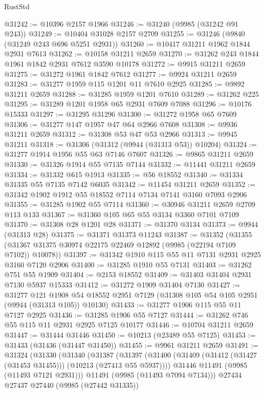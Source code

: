 \begin{lexlean}{RustStd}
\begin{coremodule}
@31242 := @10396 @2157 @1966
@31246 := @31240 (@9985 (@31242 @91 @243))
@31249 := @10404 @31028 @2157 @2709
@31255 := @31246 (@9840 (@31249 @243 @696 @5251 @2931))
@31260 := @10417 @31211 @1962 @1844 @2931 @7613
@31262 := @10158 @31211 @2659
@31270 := @31262 @243 @1844 @1961 @1842 @2931 @7612 @3590 @10178
@31272 := @9915 @31211 @2659
@31275 := @31272 @1961 @1842 @7612
@31277 := @9924 @31211 @2659
@31283 := @31277 @1959 @115 @1201 @11 @7610 @2925
@31285 := @9892 @31211 @2659
@31288 := @31285 @1959 @1201 @7610
@31289 := @31262 @225
@31295 := @31289 @1201 @1958 @65 @2931 @7609 @7088
@31296 := @10176 @15333
@31297 := @31295 @31296
@31300 := @31272 @1958 @65 @7609
@31306 := @31277 @147 @1957 @47 @64 @2966 @7608
@31308 := @9936 @31211 @2659
@31312 := @31308 @53 @47 @53 @2966
@31313 := @9945 @31211
@31318 := @31306 (@31312 (@9944 (@31313 @53)) @10204)
@31324 := @31277 @1914 @1956 @55 @63 @7146 @7607
@31326 := @9865 @31211 @2659
@31330 := @31326 @1914 @55 @7135 @7144
@31332 := @11441 @31211 @2659
@31334 := @31332 @615 @1913
@31335 := @56 @18552
@31340 := @31334 @31335 @55 @7135 @7142 @6035
@31342 := @11454 @31211 @2659
@31352 := @31342 @1902 @1912 @55 @18552 @7114 @7134 @7141 @3160 @7093 @2906
@31355 := @31285 @1902 @55 @7114
@31360 := @30946 @31211 @2659 @2709 @113 @133
@31367 := @31360 @105 @65 @55 @3134 @3360 @7101 @7109
@31370 := @31308 @28 @1201 @28
@31371 := @31370 @3134
@31373 := @9944 (@31313 @28)
@31375 := @31371 @31373 @11243
@31387 := @31352
    (@31355 (@31367 @31375 @30974 @22175 @22469 @12892 (@9985 (@22194 @7109 @7102)) @10078))
@31397 := @31342 @1910 @115 @55 @11 @7131 @2931 @2925 @3160 @7120 @2906
@31400 := @31285 @1910 @55 @7131
@31403 := @31262 @751 @55 @1909
@31404 := @2153 @18552
@31409 := @31403 @31404 @2931 @7130 @5937 @15333
@31412 := @31272 @1909 @31404 @7130
@31427 := @31277
    @121
    @1908
    @54
    @18552
    @2951
    @7129
    (@31308 @105 @54 @105 @2951 (@9944 (@31313 @105)) @10130)
@31433 := @31277 @1906 @115 @55 @11 @7127 @2925
@31436 := @31285 @1906 @55 @7127
@31444 := @31262 @746 @55 @115 @11 @2931 @2925 @7125 @10177
@31446 := @10704 @31211 @2659
@31447 := @31444 @31446
@31450 := @10213 (@23489 @55 @7125)
@31453 := @31433 (@31436 (@31447 @31450))
@31455 := @9961 @31211 @2659
@31491 := @31324
    (@31330
      (@31340
        (@31387
          (@31397
            (@31400 (@31409 (@31412 (@31427 (@31453 @31455))) (@10213 (@27413 @55 @5937))))
            @31446
            @11491
            (@9985 (@11493 @7121 @2931)))
          @11491
          (@9985 (@11493 @7094 @7134)))
        @27434
        @27437
        @27440
        (@9985 (@27442 @31335))

\end{coremodule}
\end{lexlean}
